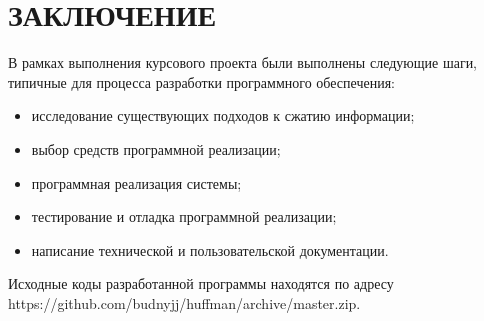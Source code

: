 \section*{ЗАКЛЮЧЕНИЕ}

В рамках выполнения курсового проекта были выполнены
следующие шаги, типичные для процесса разработки 
программного обеспечения:

\begin{itemize}
\item исследование существующих подходов к сжатию информации;
\item выбор средств программной реализации;
\item программная реализация системы;
\item тестирование и отладка программной реализации;
\item написание технической и пользовательской документации.
\end{itemize}

Исходные коды разработанной программы находятся по адресу 
https://github.com/budnyjj/huffman/archive/master.zip.
